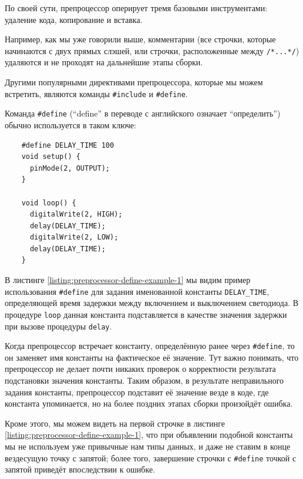 \documentclass[../sparc.tex]{subfiles}
\begin{document}
По своей сути, препроцессор оперирует тремя базовыми инструментами: удаление
кода, копирование и вставка.

Например, как мы уже говорили выше, комментарии (все строчки, которые начинаются
с двух прямых слэшей, или строчки, расположенные между
\texttt{/*...*/}) удаляются и не проходят на дальнейшие этапы сборки.

Другими популярными директивами препроцессора, которые мы можем встретить,
являются команды \texttt{#include} и \texttt{#define}.

Команда \texttt{#define} (``define'' в переводе с английского означает
``определить'') обычно используется в таком ключе:

\begin{listing}[H]
  \begin{verbatim}
    #define DELAY_TIME 100
    void setup() {
      pinMode(2, OUTPUT);
    }

    void loop() {
      digitalWrite(2, HIGH);
      delay(DELAY_TIME);
      digitalWrite(2, LOW);
      delay(DELAY_TIME);
    }
  \end{verbatim}
  \label{listing:preprocessor-define-example-1}
  \caption{Пример использования директивы препроцессора для задания константы.}
\end{listing}

В листинге \ref{listing:preprocessor-define-example-1} мы видим пример
использования \texttt{#define} для задания именованной константы
\texttt{DELAY_TIME}, определяющей время задержки между включением и
выключением светодиода.  В процедуре \texttt{loop} данная константа
подставляется в качестве значения задержки при вызове процедуры
\texttt{delay}.

Когда препроцессор встречает константу, определённую ранее через
\texttt{#define}, то он заменяет имя константы на фактическое её
значение.  Тут важно понимать, что препроцессор не делает почти никаких проверок
о корректности результата подстановки значения константы.  Таким образом, в
результате неправильного задания константы, препроцессор подставит её значение
везде в коде, где константа упоминается, но на более поздних этапах сборки
произойдёт ошибка.

Кроме этого, мы можем видеть на первой строчке в листинге
\ref{listing:preprocessor-define-example-1}, что при объявлении подобной константы
мы не используем уже привычные нам типы данных, и даже не ставим в конце
вездесущую точку с запятой; более того, завершение строчки с
\texttt{#define} точкой с запятой приведёт впоследствии к ошибке.
\end{document}
